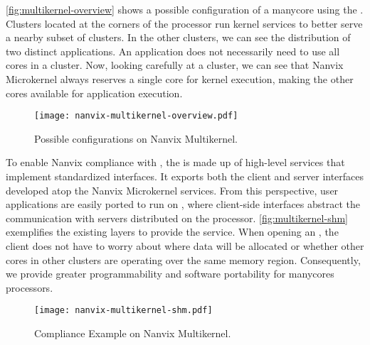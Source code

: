 		\autoref{fig:multikernel-overview} shows a possible configuration of a
		manycore using the \nanvix \multikernel.
		Clusters located at the corners of the processor run kernel services
		to better serve a nearby subset of clusters.
		In the other clusters, we can see the distribution of two distinct applications.
		An application does not necessarily need to use all cores in a cluster.
		Now, looking carefully at a cluster, we can see that Nanvix Microkernel
		always reserves a single core for kernel execution, making the other cores
		available for application execution.

		\begin{figure}[!tb]
			\centering%
			\caption{Possible configurations on Nanvix Multikernel.}%
			\label{fig:multikernel-overview}%
			\texttt{[image: nanvix-multikernel-overview.pdf]}%
		\end{figure}

		To enable Nanvix \os compliance with \posix, the \nanvix \multikernel is
		made up of high-level \os services that implement standardized interfaces.
		It exports both the client and server interfaces developed atop	the
		Nanvix Microkernel services.
		From this perspective, user applications are easily ported to run on
		\nanvix \multikernel, where client-side interfaces abstract the communication
		with servers distributed on the processor.
		\autoref{fig:multikernel-shm} exemplifies the existing layers to provide the \shm service.
		When opening an \shm, the client does not have to worry about where data
		will be allocated or whether other cores in other clusters are operating
		over the same memory region.
		Consequently, we provide greater programmability and software portability
		for manycores processors.

		\begin{figure}[!tb]
			\centering%
			\caption{\posix Compliance Example on Nanvix Multikernel.}%
			\label{fig:multikernel-shm}%
			\texttt{[image: nanvix-multikernel-shm.pdf]}%
		\end{figure}
